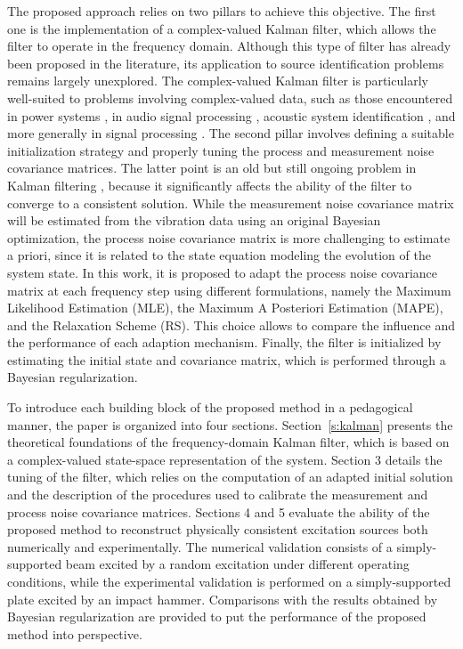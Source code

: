\documentclass[5p,12pt]{elsarticle}
\begin{document}
The proposed approach relies on two pillars to achieve this objective. The first one is the implementation of a complex-valued Kalman filter, which allows the filter to operate in the frequency domain. Although this type of filter has already been proposed in the literature, its application to source identification problems remains largely unexplored. The complex-valued Kalman filter is particularly well-suited to problems involving complex-valued data, such as those encountered in power systems \cite{Das99, Per24}, in audio signal processing \cite{Enz06}, acoustic system identification \cite{Kab22}, and more generally in signal processing \cite{Fan19, Wan19}. The second pillar involves defining a suitable initialization strategy and properly tuning the process and measurement noise covariance matrices. The latter point is an old but still ongoing problem in Kalman filtering \cite{Meh70, Dun17, Zha20}, because it significantly affects the ability of the filter to converge to a consistent solution. While the measurement noise covariance matrix will be estimated from the vibration data using an original Bayesian optimization, the process noise covariance matrix is more challenging to estimate a priori, since it is related to the state equation modeling the evolution of the system state. In this work, it is proposed to adapt the process noise covariance matrix at each frequency step using different formulations, namely the Maximum Likelihood Estimation (MLE), the Maximum A Posteriori Estimation (MAPE), and the Relaxation Scheme (RS). This choice allows to compare the influence and the performance of each adaption mechanism. Finally, the filter is initialized by estimating the initial state and covariance matrix, which is performed through a Bayesian regularization. \bigskip

To introduce each building block of the proposed method in a pedagogical manner, the paper is organized into four sections. Section~\ref{s:kalman} presents the theoretical foundations of the frequency-domain Kalman filter, which is based on a complex-valued state-space representation of the system. Section 3 details the tuning of the filter, which relies on the computation of an adapted initial solution and the description of the procedures used to calibrate the measurement and process noise covariance matrices. Sections 4 and 5 evaluate the ability of the proposed method to reconstruct physically consistent excitation sources both numerically and experimentally. The numerical validation consists of a simply-supported beam excited by a random excitation under different operating conditions, while the experimental validation is performed on a simply-supported plate excited by an impact hammer. Comparisons with the results obtained by Bayesian regularization are provided to put the performance of the proposed method into perspective.
\end{document}
